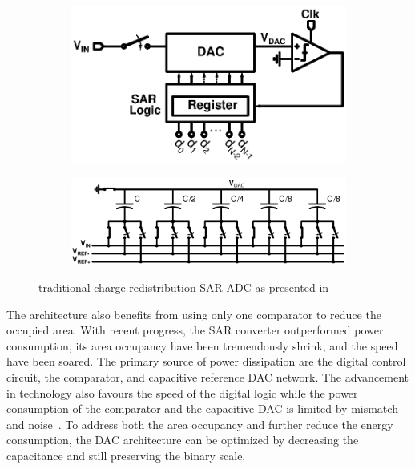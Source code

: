 \begin{figure}[htp]
	\centering
	\begin{subfigure}[b]{0.44\textwidth}
        \includegraphics[width=\textwidth]{sar_principle.ps}
        \label{fig:sar_principle}
    \end{subfigure}
    \begin{subfigure}[b]{0.52\textwidth}
        \includegraphics[width=\textwidth]{sar_classic_dac.ps}
        \label{fig:sar_dac_classical}
    \end{subfigure}
	\caption{traditional charge redistribution SAR ADC as presented in~\cite{McCreary1975}}
	\label{fig:sar_adc}
\end{figure}

The architecture also benefits from using only one comparator to reduce the occupied area. With recent progress, the SAR converter outperformed power consumption, its area occupancy have been tremendously shrink, and the speed have been soared. The primary source of power dissipation are the digital control circuit, the comparator, and capacitive reference DAC network. The advancement in technology also favours the speed of the digital logic while the power consumption of the comparator and the capacitive DAC is limited by mismatch and noise~\cite{Yue2013,Mueller2013,Collins2017}. To address both the area occupancy and further reduce the energy consumption, the DAC architecture can be optimized by decreasing the capacitance and still preserving the binary scale.

